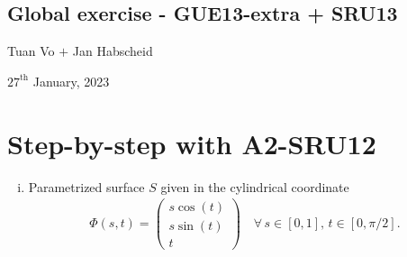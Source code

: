 \documentclass[12pt]{article}
\begin{document}
\begin{center}
	\section*{Global exercise - GUE13-extra + SRU13}
\end{center}
\begin{center}
	Tuan Vo $+$ Jan Habscheid
\end{center}
\begin{center}
	$27^{\text{th}}$ January, 2023
\end{center}
\section{Step-by-step with A2-SRU12}

\begin{enumerate}[(i)]
	\item Parametrized surface $S$ given in the cylindrical coordinate
	      \begin{align}
		      \Phi(s,t) = 
		      \begin{pmatrix}
			      s \cos(t) \\ s \sin(t) \\ t
		      \end{pmatrix}
		      \quad 
		      \forall \, s\in [0,1], \, t\in[0,\pi/2].
	      \end{align}
\end{enumerate}


% 
\end{document}
